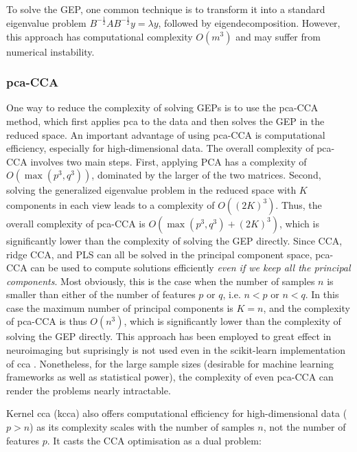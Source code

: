To solve the GEP, one common technique is to transform it into a standard eigenvalue problem \( B^{-\frac{1}{2}} A B^{-\frac{1}{2}} y = \lambda y \), followed by eigendecomposition. However, this approach has computational complexity \( O(m^3) \) and may suffer from numerical instability.

\subsubsection{\acrshort{pca}-CCA}

One way to reduce the complexity of solving GEPs is to use the \acrshort{pca}-CCA method, which first applies \acrshort{pca} to the data and then solves the GEP in the reduced space.
An important advantage of using \acrshort{pca}-CCA is computational efficiency, especially for high-dimensional data.
The overall complexity of \acrshort{pca}-CCA involves two main steps.
First, applying PCA has a complexity of \( O(\max(p^3, q^3)) \), dominated by the larger of the two matrices.
Second, solving the generalized eigenvalue problem in the reduced space with \( K \) components in each view leads to a complexity of \( O((2K)^3) \).
Thus, the overall complexity of \acrshort{pca}-CCA is \( O(\max(p^3, q^3) + (2K)^3) \), which is significantly lower than the complexity of solving the GEP directly.
Since CCA, ridge CCA, and PLS can all be solved in the principal component space, \acrshort{pca}-CCA can be used to compute solutions efficiently \textit{even if we keep all the principal components}.
Most obviously, this is the case when the number of samples \( n \) is smaller than either of the number of features \( p \) or \( q \), i.e. \( n < p \) or \( n < q \).
In this case the maximum number of principal components is \( K=n \), and the complexity of \acrshort{pca}-CCA is thus \( O(n^3) \), which is significantly lower than the complexity of solving the GEP directly.
This approach has been employed to great effect in neuroimaging but suprisingly is not used even in the scikit-learn implementation of \acrshort{cca} \citep{pedregosa2011scikit}.
Nonetheless, for the large sample sizes (desirable for machine learning frameworks as well as statistical power), the complexity of even \acrshort{pca}-CCA can render the problems nearly intractable.

Kernel \acrshort{cca} (\acrshort{kcca}) also offers computational efficiency for high-dimensional data (\(p>n\)) as its complexity scales with the number of samples \(n\), not the number of features \(p\).
It casts the CCA optimisation as a dual problem:

